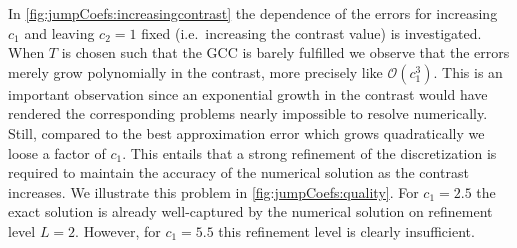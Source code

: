 \documentclass[sn-mathphys-num]{sn-jnl}
\numberwithin{equation}{section}
\begin{document}
In \cref{fig:jumpCoefs:increasingcontrast} the dependence of the errors for increasing $c_1$ and 
leaving $c_2 = 1$ fixed (i.e.\ increasing the contrast value) is investigated. When $T$ is chosen such that the GCC is barely fulfilled we observe that the errors merely grow polynomially in the contrast, more precisely like $\mathcal{O}(c_1^3)$.
This is an important observation since an exponential growth in the contrast would have rendered the corresponding problems nearly impossible to resolve numerically.
Still, compared to the best approximation error which grows quadratically we loose a factor of $c_1$. This entails that a strong refinement of the discretization is required to maintain the accuracy of the numerical solution as the contrast increases. We illustrate this problem in \cref{fig:jumpCoefs:quality}. For $c_1 = 2.5$ the exact solution is already well-captured by the numerical solution on refinement level $L=2$. However, for $c_1 = 5.5$ this refinement level is clearly insufficient. 
\end{document}
